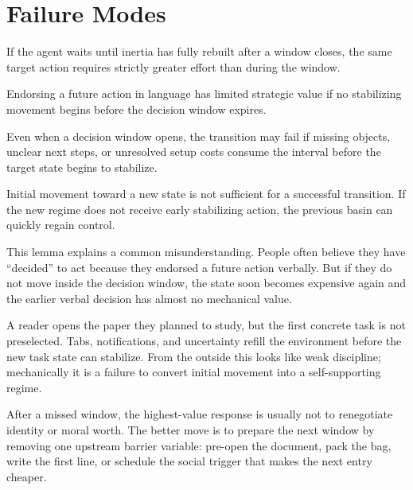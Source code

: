\section{Failure Modes}

\begin{lemma}
If the agent waits until inertia has fully rebuilt after a window closes, the
same target action requires strictly greater effort than during the window.
\end{lemma}

\begin{corollary}
Endorsing a future action in language has limited strategic value if no
stabilizing movement begins before the decision window expires.
\end{corollary}

\begin{proposition}
Even when a decision window opens, the transition may fail if missing objects,
unclear next steps, or unresolved setup costs consume the interval before the
target state begins to stabilize.
\end{proposition}

\begin{proposition}
Initial movement toward a new state is not sufficient for a successful
transition. If the new regime does not receive early stabilizing action, the
previous basin can quickly regain control.
\end{proposition}

\begin{discussion}
This lemma explains a common misunderstanding. People often believe they have
``decided'' to act because they endorsed a future action verbally. But if they
do not move inside the decision window, the state soon becomes expensive again
and the earlier verbal decision has almost no mechanical value.
\end{discussion}

\begin{example}
A reader opens the paper they planned to study, but the first concrete task is
not preselected. Tabs, notifications, and uncertainty refill the environment
before the new task state can stabilize. From the outside this looks like weak
discipline; mechanically it is a failure to convert initial movement into a
self-supporting regime.
\end{example}

\begin{remark}
After a missed window, the highest-value response is usually not to renegotiate
identity or moral worth. The better move is to prepare the next window by
removing one upstream barrier variable: pre-open the document, pack the bag,
write the first line, or schedule the social trigger that makes the next entry
cheaper.
\end{remark}
